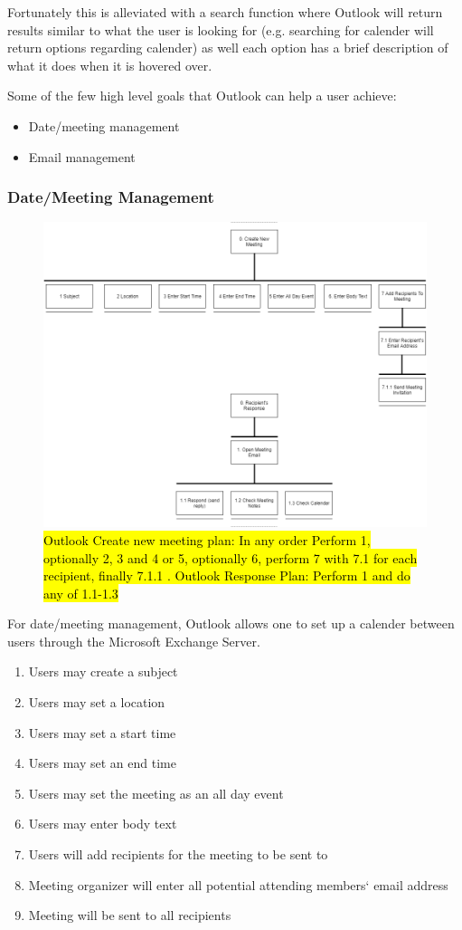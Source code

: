 \documentclass{sigchi}
\begin{document}
Fortunately this is alleviated with a search function where Outlook will return results similar to what the user is looking for (e.g. searching for calender will return options regarding calender) as well each option has a brief description of what it does when it is hovered over.

Some of the few high level goals that Outlook can help a user achieve:
\begin{itemize}
	\item Date/meeting management
	\item Email management
\end{itemize}

\subsubsection{Date/Meeting Management}

\begin{figure}
  \centering
  \includegraphics[width=1.75\columnwidth]{Outlook/Create_Meeting}
  \caption{\hl{Outlook Create new meeting plan: In any order Perform 1, optionally 2, 3 and 4 or 5, optionally 6, perform 7 with 7.1 for each recipient, finally 7.1.1 . Outlook Response Plan: Perform 1 and do any of 1.1-1.3}}
\end{figure}

For date/meeting management, Outlook allows one to set up a calender between users through the Microsoft Exchange Server.
\begin{enumerate}
\item Users may create a subject
\item Users may set a location
\item Users may set a start time
\item Users may set an end time
\item Users may set the meeting as an all day event
\item Users may enter body text
\item Users will add recipients for the meeting to be sent to
\item Meeting organizer will enter all potential attending members` email address
\item Meeting will be sent to all recipients
\end{enumerate}
\end{document}
